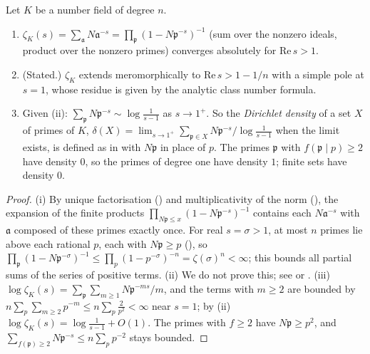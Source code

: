 \begin{proposition}\label{prop:ant:dedekindzeta}
Let $K$ be a number field of degree $n$.
\begin{enumerate}[label=(\roman*)]
\item $\zeta_K(s)=\sum_{\mathfrak a}N\mathfrak a^{-s}=\prod_{\mathfrak p}(1-N\mathfrak p^{-s})^{-1}$ (sum over the nonzero ideals, product over the nonzero primes)
converges absolutely for $\mathrm{Re}\,s>1$.
\item (Stated.) $\zeta_K$ extends meromorphically to $\mathrm{Re}\,s>1-1/n$ with a simple pole at $s=1$, whose residue is given by the analytic class number
formula.
\item Given (ii): $\sum_{\mathfrak p}N\mathfrak p^{-s}\sim\log\frac1{s-1}$ as $s\to1^+$. So the \emph{Dirichlet density} of a set $X$ of primes of $K$,
$\delta(X)=\lim_{s\to1^+}\sum_{\mathfrak p\in X}N\mathfrak p^{-s}\big/\log\frac1{s-1}$ when the limit exists, is defined as in  with $N\mathfrak p$ in
place of $p$. The primes $\mathfrak p$ with $f(\mathfrak p\mid p)\ge2$ have density $0$, so the primes of degree one have density $1$; finite sets have
density $0$.
\end{enumerate}
\end{proposition}

\begin{proof}
(i) By unique factorisation () and multiplicativity of the norm (), the expansion of the finite
products $\prod_{N\mathfrak p\le x}(1-N\mathfrak p^{-s})^{-1}$ contains each $N\mathfrak a^{-s}$ with $\mathfrak a$ composed of these primes exactly once. For real
$s=\sigma>1$, at most $n$ primes lie above each rational $p$, each with $N\mathfrak p\ge p$ (), so
$\prod_{\mathfrak p}(1-N\mathfrak p^{-\sigma})^{-1}\le\prod_p(1-p^{-\sigma})^{-n}=\zeta(\sigma)^n<\infty$; this bounds all partial sums of the series of positive terms.
(ii) We do not prove this; see \cite[Chapter VII, Section 5]{Neukirch} or \cite[Chapter VIII]{LangANT}. (iii) $\log\zeta_K(s)=\sum_{\mathfrak p}\sum_{m\ge1}
N\mathfrak p^{-ms}/m$, and the terms with $m\ge2$ are bounded by $n\sum_p\sum_{m\ge2}p^{-m}\le n\sum_p\frac{2}{p^2}<\infty$ near $s=1$; by (ii)
$\log\zeta_K(s)=\log\frac1{s-1}+O(1)$. The primes with $f\ge2$ have $N\mathfrak p\ge p^2$, and $\sum_{f(\mathfrak p)\ge2}N\mathfrak p^{-s}\le n\sum_pp^{-2}$ stays
bounded.
\end{proof}

